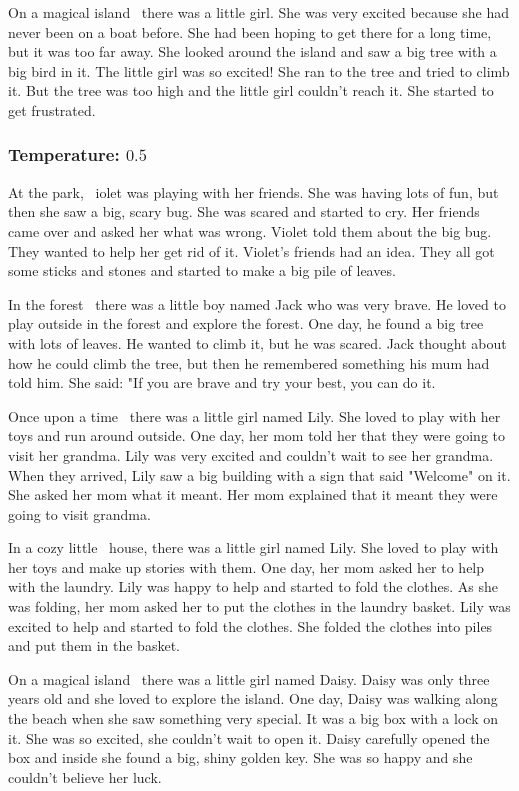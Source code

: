 \documentclass[11pt]{article}
\begin{document}
    On a magical island \textellipsis\ there was a little girl. She was very excited because she had never been on a boat before. She had been hoping to get there for a long time, but it was too far away. She looked around the island and saw a big tree with a big bird in it. The little girl was so excited! She ran to the tree and tried to climb it. But the tree was too high and the little girl couldn't reach it. She started to get frustrated.

    \subsubsection*{Temperature: $0.5$}

    At the park, \textellipsis\ iolet was playing with her friends. She was having lots of fun, but then she saw a big, scary bug. She was scared and started to cry. Her friends came over and asked her what was wrong. Violet told them about the big bug. They wanted to help her get rid of it. Violet's friends had an idea. They all got some sticks and stones and started to make a big pile of leaves.

    In the forest \textellipsis\ there was a little boy named Jack who was very brave. He loved to play outside in the forest and explore the forest. One day, he found a big tree with lots of leaves. He wanted to climb it, but he was scared. Jack thought about how he could climb the tree, but then he remembered something his mum had told him. She said: "If you are brave and try your best, you can do it.

    Once upon a time \textellipsis\ there was a little girl named Lily. She loved to play with her toys and run around outside. One day, her mom told her that they were going to visit her grandma. Lily was very excited and couldn't wait to see her grandma. When they arrived, Lily saw a big building with a sign that said "Welcome" on it. She asked her mom what it meant. Her mom explained that it meant they were going to visit grandma.

    In a cozy little \textellipsis\ house, there was a little girl named Lily. She loved to play with her toys and make up stories with them. One day, her mom asked her to help with the laundry. Lily was happy to help and started to fold the clothes. As she was folding, her mom asked her to put the clothes in the laundry basket. Lily was excited to help and started to fold the clothes. She folded the clothes into piles and put them in the basket.

    On a magical island \textellipsis\ there was a little girl named Daisy. Daisy was only three years old and she loved to explore the island. One day, Daisy was walking along the beach when she saw something very special. It was a big box with a lock on it. She was so excited, she couldn't wait to open it. Daisy carefully opened the box and inside she found a big, shiny golden key. She was so happy and she couldn't believe her luck.
\end{document}

